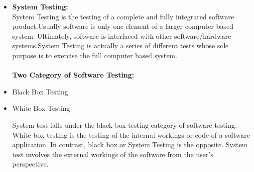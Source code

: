 \documentclass[12pt,a4paper]
{article}
\numberwithin{table}{section}
\begin{document}
{{{{{{{{\begin{itemize}
\textbf{Purpose:}\\
The purpose of integration testing is to verify functional, performance, and reliability requirements placed on major design items. These "design items", i.e., assemblages (or groups of units), are exercised through their interfaces using black box testing, success and error cases being simulated via appropriate parameter and data inputs. Simulated usage of shared data areas and inter-process communication is tested and individual subsystems are exercised through their input interface. Test cases are constructed to test whether all the components within assemblages interact correctly, for example across procedure calls or process activations, and this is done after testing individual modules, i.e., unit testing. The overall idea is a "building block" approach, in which verified assemblages are added to a verified base which is then used to support the integration testing of further assemblages.
Software Integration Testing is performed according to the Software Development Life Cycle (SDLC) after module and functional tests. The cross-dependencies for software integration testing are: schedule for integration testing, strategy and selection of the tools used for integration, define the cyclomatical complexity of the software and software architecture, reusability of modules and life-cycle / versioning management.\\ Some different types of integration testing are big bang, top-down, and bottom-up, mixed (sandwich) and risky - hardest. Other Integration Patternsare: Collaboration Integration, Backbone Integration, Layer Integration, Client/Server Integration, Distributed Services Integration and High-frequency Integration.

\item\textbf{System Testing:}\\
System Testing is the testing of a complete and fully integrated software product.Usually software is only one element of a larger computer based system. Ultimately, software is interfaced with other software/hardware systems.System Testing is actually a series of different tests whose sole purpose is to exercise the full computer based system.\\ \\
\textbf{Two Category of Software Testing: }
\item Black Box Testing
\item White Box Testing

System test falls under the black box testing category of software testing.\\White box testing is the testing of the internal workings or code of a software application. In contrast, black box or System Testing is the opposite. System test involves the external workings of the software from the user's perspective.
\end{itemize}
\\

}}}}}}}}
\end{document}
